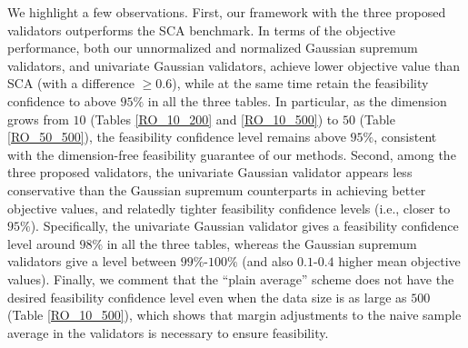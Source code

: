 \documentclass[mnsc,blindrev]{informs4} %
\begin{document}
We highlight a few observations. First, our framework with the three proposed validators outperforms the SCA benchmark. In terms of the objective performance, both our unnormalized and normalized Gaussian supremum validators, and univariate Gaussian validators, achieve lower objective value than SCA (with a difference $\geq 0.6$), while at the same time retain the feasibility confidence to above $95\%$ in all the three tables. In particular, as the dimension grows from $10$ (Tables \ref{RO_10_200} and \ref{RO_10_500}) to $50$ (Table \ref{RO_50_500}), the feasibility confidence level remains above $95\%$, consistent with the dimension-free feasibility guarantee of our methods. Second, among the three proposed validators, the univariate Gaussian validator appears less conservative than the Gaussian supremum counterparts in achieving better objective values, and relatedly tighter feasibility confidence levels (i.e., closer to $95\%$). Specifically, the univariate Gaussian validator gives a feasibility confidence level around $98\%$ in all the three tables, whereas the Gaussian supremum validators give a level between $99\%$-$100\%$ (and also $0.1$-$0.4$ higher mean objective values). Finally, we comment that the ``plain average'' scheme does not have the desired feasibility confidence level even when the data size is as large as $500$ (Table \ref{RO_10_500}), which shows that margin adjustments to the naive sample average in the validators is necessary to ensure feasibility.
\end{document}
